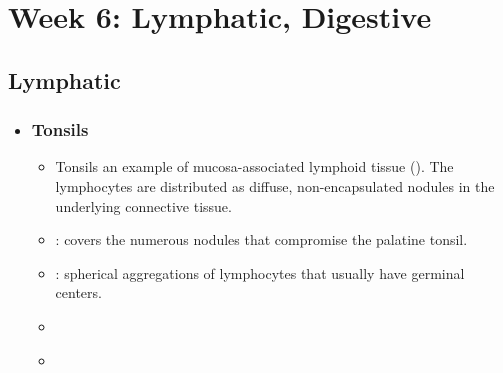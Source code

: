 \chapter{Week 6: Lymphatic, Digestive}
\section{Lymphatic}
\begin{itemize}
  \item[]

  \subsection{Tonsils}
  \begin{itemize}
    \item Tonsils an example of mucosa-associated lymphoid tissue (). The lymphocytes are distributed as diffuse, non-encapsulated nodules in the underlying connective tissue.
  \end{itemize}
  \begin{multicols}{2}
  \begin{itemize}
    
    \item {}:  covers the numerous nodules that compromise the palatine tonsil.
    
    \begin{center}
    \end{center}
    
    \item {}: spherical aggregations of lymphocytes that usually have germinal centers.
    
    \begin{center}
    \end{center}

    \item {}
    
    \begin{center}
    \end{center}
    
    
    \item {}
    
    \begin{center}
    \end{center}


\end{itemize}
\end{multicols}
\end{itemize}
